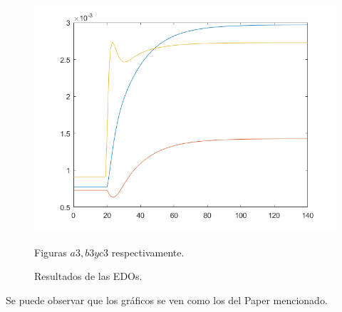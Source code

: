 \begin{figure}[h!]
\includegraphics[scale=0.3]{../c3.png}
\caption{Figuras $a3, b3 y c3$ respectivamente.}
\caption{Resultados de las EDOs.}
\label{circnpnmaxout}
\end{figure}

Se puede observar que los gr\'aficos se ven como los del Paper mencionado.


